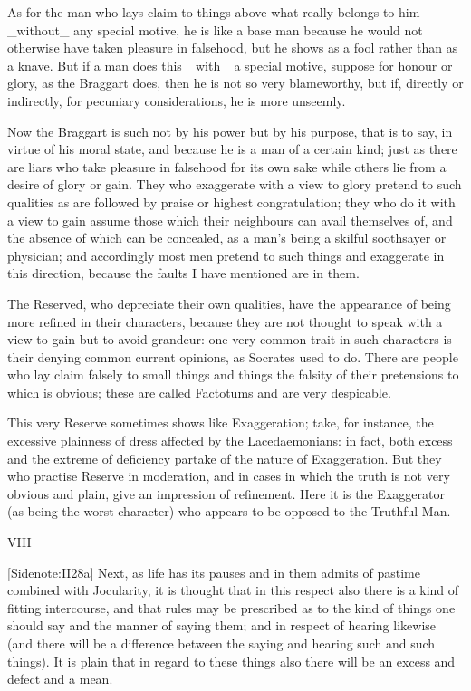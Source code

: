 As for the man who lays claim to things above what really belongs to him
_without_ any special motive, he is like a base man because he would
not otherwise have taken pleasure in falsehood, but he shows as a fool
rather than as a knave. But if a man does this _with_ a special motive,
suppose for honour or glory, as the Braggart does, then he is not
so very blameworthy, but if, directly or indirectly, for pecuniary
considerations, he is more unseemly.

Now the Braggart is such not by his power but by his purpose, that is to
say, in virtue of his moral state, and because he is a man of a certain
kind; just as there are liars who take pleasure in falsehood for its
own sake while others lie from a desire of glory or gain. They who
exaggerate with a view to glory pretend to such qualities as are
followed by praise or highest congratulation; they who do it with a view
to gain assume those which their neighbours can avail themselves of,
and the absence of which can be concealed, as a man's being a skilful
soothsayer or physician; and accordingly most men pretend to such things
and exaggerate in this direction, because the faults I have mentioned
are in them.

The Reserved, who depreciate their own qualities, have the appearance of
being more refined in their characters, because they are not thought to
speak with a view to gain but to avoid grandeur: one very common trait
in such characters is their denying common current opinions, as Socrates
used to do. There are people who lay claim falsely to small things and
things the falsity of their pretensions to which is obvious; these are
called Factotums and are very despicable.

This very Reserve sometimes shows like Exaggeration; take, for instance,
the excessive plainness of dress affected by the Lacedaemonians: in
fact, both excess and the extreme of deficiency partake of the nature of
Exaggeration. But they who practise Reserve in moderation, and in cases
in which the truth is not very obvious and plain, give an impression of
refinement. Here it is the Exaggerator (as being the worst character)
who appears to be opposed to the Truthful Man.

VIII

[Sidenote:II28a] Next, as life has its pauses and in them admits of
pastime combined with Jocularity, it is thought that in this respect
also there is a kind of fitting intercourse, and that rules may be
prescribed as to the kind of things one should say and the manner of
saying them; and in respect of hearing likewise (and there will be a
difference between the saying and hearing such and such things). It is
plain that in regard to these things also there will be an excess and
defect and a mean.

